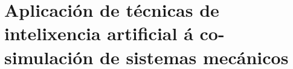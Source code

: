 
\section{Aplicación de técnicas de intelixencia artificial á co-simulación de sistemas mecánicos}






